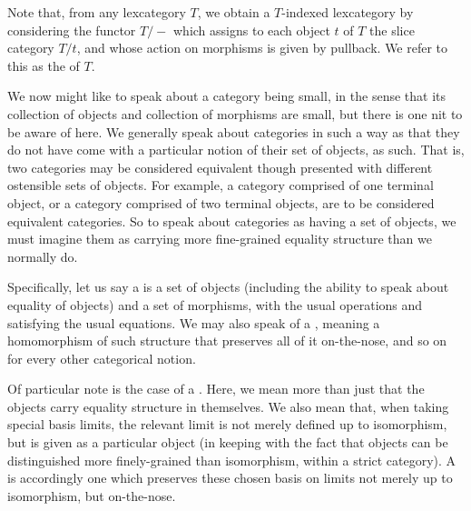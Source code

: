 Note that, from any lexcategory $T$, we obtain a $T$-indexed lexcategory by considering the functor $T/-$ which assigns to each object $t$ of $T$ the slice category $T/t$, and whose action on morphisms is given by pullback. We refer to this as the  of $T$.

We now might like to speak about a category being small, in the sense that its collection of objects and collection of morphisms are small, but there is one nit to be aware of here. We generally speak about categories in such a way as that they do not have come with a particular notion of their set of objects, as such. That is, two categories may be considered equivalent though presented with different ostensible sets of objects. For example, a category comprised of one terminal object, or a category comprised of two terminal objects, are to be considered equivalent categories. So to speak about categories as having a set of objects, we must imagine them as carrying more fine-grained equality structure than we normally do.

Specifically, let us say a  is a set of objects (including the ability to speak about equality of objects) and a set of morphisms, with the usual operations and satisfying the usual equations.  We may also speak of a , meaning a homomorphism of such structure that preserves all of it on-the-nose, and so on for every other categorical notion.

Of particular note is the case of a . Here, we mean more than just that the objects carry equality structure in themselves. We also mean that, when taking special basis limits, the relevant limit is not merely defined up to isomorphism, but is given as a particular object (in keeping with the fact that objects can be distinguished more finely-grained than isomorphism, within a strict category). A  is accordingly one which preserves these chosen basis on limits not merely up to isomorphism, but on-the-nose. 

